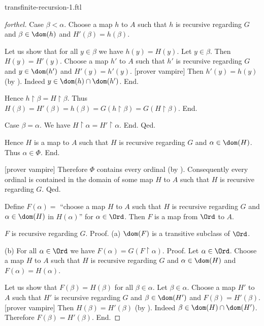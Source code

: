 \documentclass{naproche-library}
\begin{document}
\begin{smodule}[title=Transfinite Recursion I]{transfinite-recursion-1.ftl}
\begin{proof}[forthel]
        Case $\beta < \alpha$.
          Choose a map $h$ to $A$ such that $h$ is recursive regarding $G$ and $\beta \in \dom(h)$ and $H'(\beta) = h(\beta)$.

          Let us show that for all $y \in \beta$ we have $h(y) = H(y)$.
            Let $y \in \beta$.
            Then $H(y) = H'(y)$.
            Choose a map $h'$ to $A$ such that $h'$ is recursive regarding $G$ and $y \in \dom(h')$ and $H'(y) = h'(y)$.
            [prover vampire]
            Then $h'(y) = h(y)$ (by ).
            Indeed $y \in \dom(h) \cap \dom(h')$.
          End.

          Hence $h \restriction \beta = H \restriction \beta$.
          Thus $H(\beta)
            = H'(\beta)
            = h(\beta)
            = G(h \restriction \beta)
            = G(H \restriction \beta)$.
        End.

        Case $\beta = \alpha$.
          We have $H \restriction \alpha = H' \restriction \alpha$.
        End.
      Qed.

      Hence $H$ is a map to $A$ such that $H$ is recursive regarding $G$ and $\alpha \in \dom(H)$.
      Thus $\alpha \in \Phi$.
    End.

    [prover vampire]
    Therefore $\Phi$ contains every ordinal (by ).
    Consequently every ordinal is contained in the domain of some map $H$ to $A$ such that $H$ is recursive regarding $G$.
  Qed.

  Define $F(\alpha) =$ ``choose a map $H$ to $A$ such that $H$ is recursive regarding $G$ and $\alpha \in \dom(H)$ in $H(\alpha)$'' for $\alpha \in \Ord$.
  Then $F$ is a map from $\Ord$ to $A$.

  $F$ is recursive regarding $G$. \newline
  Proof.
    (a) $\dom(F)$ is a transitive subclass of $\Ord$.

    (b) For all $\alpha \in \Ord$ we have $F(\alpha) = G(F \restriction \alpha)$. \newline
    Proof.
      Let $\alpha \in \Ord$.
      Choose a map $H$ to $A$ such that $H$ is recursive regarding $G$ and $\alpha \in \dom(H)$ and $F(\alpha) = H(\alpha)$.

      Let us show that $F(\beta) = H(\beta)$ for all $\beta \in \alpha$.
        Let $\beta \in \alpha$.
        Choose a map $H'$ to $A$ such that $H'$ is recursive regarding $G$ and $\beta \in \dom(H')$ and $F(\beta) = H'(\beta)$.
        [prover vampire]
        Then $H(\beta) = H'(\beta)$ (by ).
        Indeed $\beta \in \dom(H) \cap \dom(H')$.
        Therefore $F(\beta) = H'(\beta)$.
      End.


\end{proof}
\end{smodule}
\end{document}
